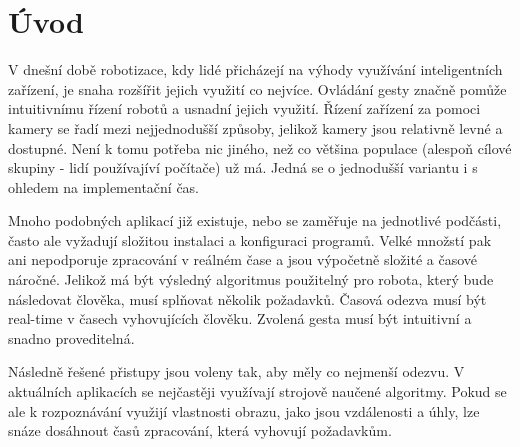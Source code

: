 \chapter{Úvod}
V dnešní době robotizace, kdy lidé přicházejí na výhody využívání inteligentních zařízení, je snaha rozšířit jejich využití co nejvíce. Ovládání gesty značně pomůže intuitivnímu řízení robotů a usnadní jejich využití.
Řízení zařízení za pomoci kamery se řadí mezi nejjednodušší způsoby, jelikož kamery jsou relativně levné a dostupné. Není k tomu potřeba nic jiného, než co většina populace (alespoň cílové skupiny - lidí používajíví počítače) už má. Jedná se o jednodušší variantu i s ohledem na implementační čas.

Mnoho podobných aplikací již existuje, nebo se zaměřuje na jednotlivé podčásti, často ale vyžadují složitou instalaci a konfiguraci programů. Velké množstí pak ani nepodporuje zpracování v reálném čase a jsou výpočetně složité a časové náročné.
Jelikož má být výsledný algoritmus použitelný pro robota, který  bude  následovat člověka, musí splňovat několik požadavků. Časová odezva musí být real-time v časech vyhovujících člověku. Zvolená gesta musí být intuitivní a snadno proveditelná. 		%

Následně řešené přistupy jsou voleny tak, aby měly co nejmenší odezvu. 
V aktuálních aplikacích se nejčastěji využívají strojově naučené algoritmy. Pokud se ale k rozpoznávání využijí vlastnosti obrazu, jako jsou vzdálenosti a úhly, lze snáze dosáhnout časů zpracování, která vyhovují požadavkům.






\endinput